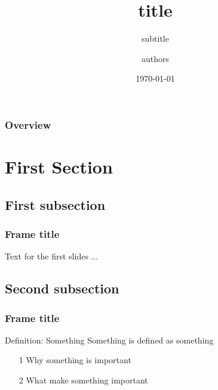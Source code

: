 \documentclass{beamer}
\title[keywords]{title
} %
\subtitle{subtitle}
\author{authors} %
\institute[institution] %
{presented by Shin (Jiayuan) Chen\\

	School of Finance\\
	UNSW Business School\\ \\ %
\medskip
	\begin{figure}
		\centering
		\begin{subfigure}{\textwidth}
			\centering
			\texttt{[image: unsw.png]}
		\end{subfigure}%
		
	\end{figure}}
\date{\today} %
\begin{document}
\begin{frame}
\titlepage %
\end{frame}

\begin{frame}
\frametitle{Overview} %
\tableofcontents %
[
  currentsection,
  sectionstyle=show,
  subsectionstyle=show,
  subsubsectionstyle=hide
]
\end{frame}


\section{First Section} %
\subsection{First subsection}

\begin{frame}
	\frametitle{Frame title}
	Text for the first slides ...
\end{frame}



\subsection{Second subsection}
\begin{frame}
	\frametitle{Frame title}
	\begin{block}{Definition: Something}
	Something is defined as something
\end{block}
\begin{itemize}
	\item[1] Why something is important
	\item[2] What make something important
\end{itemize}
\vspace{2mm}

\end{frame}
\end{document}
